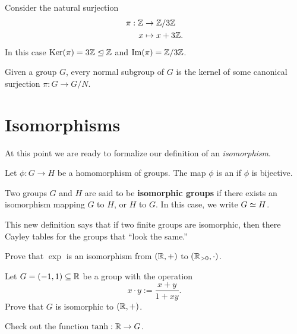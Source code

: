 \documentclass{ximera}
\begin{document}
\begin{example}
    Consider the natural surjection
  \begin{align*}
    \pi:\mathbb Z &\to \mathbb Z/3\mathbb Z\\
    x &\mapsto x+3\mathbb Z.
  \end{align*}
  In this case $\mathop{\mathrm{Ker}}\nolimits(\pi) = 3\mathbb Z \trianglelefteq \mathbb Z$ and $\operatorname{Im}(\pi) = \mathbb Z/3\mathbb Z$.
\end{example}


\begin{corollary}
  Given a group $G$, every normal subgroup of $G$ is the kernel of
  some canonical surjection $\pi:G\to G/N$.
\end{corollary}




\section{Isomorphisms}

At this point we are ready to formalize our definition of an
\textit{isomorphism}.

\begin{definition}
  Let $\phi:G\to H$ be a homomorphism of groups. The map $\phi$ is an
   if $\phi$ is bijective.


  Two groups $G$ and $H$ are said to be \textbf{isomorphic groups} if
  there exists an isomorphism mapping $G$ to $H$, or $H$ to $G$.  In
  this case, we write $G\simeq H$.
\end{definition}


This new definition says that if two finite groups are isomorphic,
then there Cayley tables for the groups that ``look the same.''

\begin{exercise}
  Prove that $\exp$ is an isomorphism from $(\mathbb R,+)$ to $(\mathbb R_{>
    0},\cdot)$.
\end{exercise}


\begin{exercise}
  Let $G = (-1,1)\subseteq \mathbb R$ be a group with the operation
  \[
  x\cdot y := \frac{x+y}{1+xy}.
  \]
  Prove that $G$ is isomorphic to $(\mathbb R,+)$.

  \begin{hint}
    Check out the function $\tanh: \mathbb R\to G$.
  \end{hint}
\end{exercise}
\end{document}
